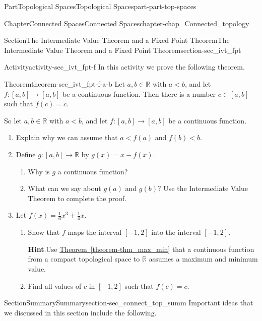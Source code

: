 \documentclass[oneside,10pt,]{book}
\newcommand{\blocktitlefont}{\relax}
\newcommand{\xreffont}{\relax}
\numberwithin{equation}{chapter}
\newcommand{\R}{\mathbb{R}}
\newcommand{\lt}{<}
\begin{document}
\begin{partptx}{Part}{Topological Spaces}{}{Topological Spaces}{}{}{part-part-top-spaces}
\begin{chapterptx}{Chapter}{Connected Spaces}{}{Connected Spaces}{}{}{chapter-chap_Connected_topology}
\begin{sectionptx}{Section}{The Intermediate Value Theorem and a Fixed Point Theorem}{}{The Intermediate Value Theorem and a Fixed Point Theorem}{}{}{section-sec_ivt_fpt}
\begin{activity}{Activity}{}{activity-sec_ivt_fpt-f}%
In this activity we prove the following theorem.%
\begin{theorem}{Theorem}{}{}{theorem-sec_ivt_fpt-f-a-b}%
Let \(a,b \in \R\) with \(a \lt b\), and let \(f : [a,b] \to [a,b]\) be a continuous function. Then there is a number \(c \in [a,b]\) such that \(f(c) = c\).%
\end{theorem}
So let \(a,b \in \R\) with \(a \lt b\), and let \(f : [a,b] \to [a,b]\) be a continuous function.%
\begin{enumerate}[font=\bfseries,label=(\alph*),ref=\alph*]%
\item{}Explain why we can assume that \(a \lt f(a)\) and \(f(b) \lt b\).%
\item{}Define \(g : [a,b] \to \R\) by \(g(x) = x-f(x)\).%
\begin{enumerate}[font=\bfseries,label=(\roman*),ref=\theenumi.\roman*]%
\item{}Why is \(g\) a continuous function?%
\item{}What can we say about \(g(a)\) and \(g(b)\)? Use the Intermediate Value Theorem to complete the proof.%
\end{enumerate}%
\item{}Let \(f(x) = \frac{1}{6}x^3+\frac{1}{4}x\).%
\begin{enumerate}[font=\bfseries,label=(\roman*),ref=\theenumi.\roman*]%
\item{}Show that \(f\) maps the interval \([-1,2]\) into the interval \([-1,2]\).%
\par\smallskip%
\noindent\textbf{\blocktitlefont Hint}.\hypertarget{hint-sec_ivt_fpt-f-d-b-b}{}\quad{}Use \hyperref[theorem-thm_max_min]{Theorem~{\xreffont\ref{theorem-thm_max_min}}} that a continuous function from a compact topological space to \(\R\) assumes a maximum and minimum value.%
\item{}Find all values of \(c\) in \([-1,2]\) such that \(f(c) = c\).%
\end{enumerate}%
\end{enumerate}%
\end{activity}%
\end{sectionptx}
%
%
\typeout{************************************************}
\typeout{************************************************}
%
\begin{sectionptx}{Section}{Summary}{}{Summary}{}{}{section-sec_connect_top_summ}
Important ideas that we discussed in this section include the following.%

\end{sectionptx}
\end{chapterptx}
\end{partptx}
\end{document}

